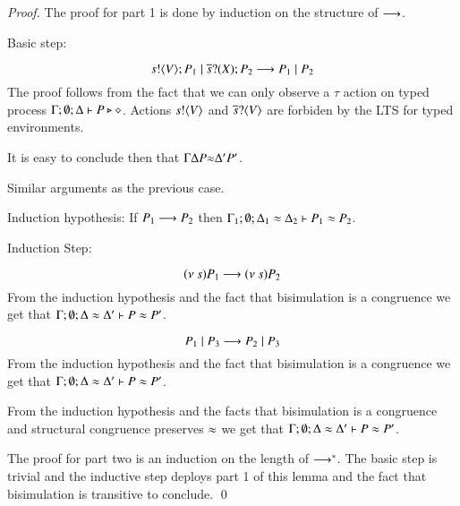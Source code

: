 \begin{proof}
	The proof for part 1 is done by induction on the structure of $\red$.

	Basic step:

	\[
		\bout{s}{V} P_1 \Par \binp{\dual{s}}{X} P_2 \red P_1 \Par P_2
	\]
	The proof follows from the fact that we can only observe a $\tau$
	action on typed process
	$\Gamma; \emptyset; \Delta \proves P \hastype \Proc$.
	Actions $\bactout{s}{V}$ and $\bactinp{\dual{s}}{V}$
	are forbiden by the LTS for typed environments.

	It is easy to conclude then that ${\Gamma}{\Delta}{P}{\wb}{\Delta'}{P'}$.


	Similar arguments as the previous case.

	Induction hypothesis:
	If $P_1 \red P_2$ then
	$\horel{\Gamma_1}{\Delta_1}{P_1}{\wb}{\Delta_2}{P_2}$.

	Induction Step:

	\[
		\news{s}{P_1} \red \news{s} P_2
	\]
	From the induction hypothesis and the fact that bisimulation is a congruence
	we get that $\horel{\Gamma}{\Delta}{P}{\wb}{\Delta'}{P'}$.


	\[
		P_1 \Par P_3 \red P_2 \Par P_3
	\]
	From the induction hypothesis and the fact that bisimulation is a congruence
	we get that $\horel{\Gamma}{\Delta}{P}{\wb}{\Delta'}{P'}$.


	From the induction hypothesis and the facts that bisimulation is a congruence
	and structural congruence preserves $\wb$
	we get that $\horel{\Gamma}{\Delta}{P}{\wb}{\Delta'}{P'}$.


	The proof for part two is an induction on the length of $\red^*$.
	The basic step is trivial and the inductive step
	deploys part 1 of this lemma and the fact that bisimulation is
	transitive to conclude.
	\qed
\end{proof}


